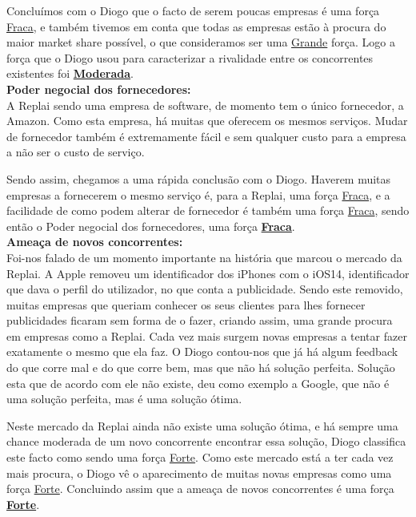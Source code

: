 Concluímos com o Diogo que o facto de serem poucas empresas é uma força \underline{Fraca}, e também tivemos em conta que todas as empresas estão à procura do maior market share possível, o que consideramos ser uma \underline{Grande} força. Logo a força que o Diogo usou para caracterizar a rivalidade entre os concorrentes existentes foi \textbf{\underline{Moderada}}.\\

\noindent\textbf{Poder negocial dos fornecedores:}\\

A Replai sendo uma empresa de software, de momento tem o único fornecedor, a Amazon. Como esta empresa, há muitas que oferecem os mesmos serviços. Mudar de fornecedor também é extremamente fácil e sem qualquer custo para a empresa a não ser o custo de serviço.

Sendo assim, chegamos a uma rápida conclusão com o Diogo. Haverem muitas empresas a fornecerem o mesmo serviço é, para a Replai, uma força \underline{Fraca}, e a facilidade de como podem alterar de fornecedor é também uma força \underline{Fraca}, sendo então o Poder negocial dos fornecedores, uma força \textbf{\underline{Fraca}}.\\

\newpage
\noindent\textbf{Ameaça de novos concorrentes:}\\

Foi-nos falado de um momento importante na história que marcou o mercado da Replai. A Apple removeu um identificador dos iPhones com o iOS14, identificador que dava o perfil do utilizador, no que conta a publicidade. Sendo este removido, muitas empresas que queriam conhecer os seus clientes para lhes fornecer publicidades ficaram sem forma de o fazer, criando assim, uma grande procura em empresas como a Replai. Cada vez mais surgem novas empresas a tentar fazer exatamente o mesmo que ela faz. O Diogo contou-nos que já há algum feedback do que corre mal e do que corre bem, mas que não há solução perfeita. Solução esta que de acordo com ele não existe, deu como exemplo a Google, que não é uma solução perfeita, mas é uma solução ótima. 

Neste mercado da Replai ainda não existe uma solução ótima, e há sempre uma chance moderada de um novo concorrente encontrar essa solução, Diogo classifica este facto como sendo uma força \underline{Forte}. Como este mercado está a ter cada vez mais procura, o Diogo vê o aparecimento de muitas novas empresas como uma força \underline{Forte}. Concluindo assim que a ameaça de novos concorrentes é uma força \textbf{\underline{Forte}}.\\

